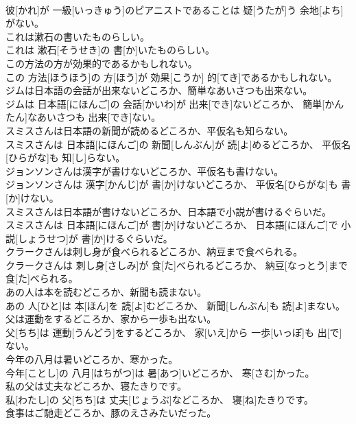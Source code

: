 \documentclass[8pt]{extreport}
\begin{document}
\begin{CJK}{UTF8}{min}
\\	彼[かれ]が 一級[いっきゅう]のピアニストであることは 疑[うたが]う 余地[よち]がない。
\\	これは漱石の書いたものらしい。	
\\	これは 漱石[そうせき]の 書[か]いたものらしい。
\\	この方法の方が効果的であるかもしれない。	
\\	この 方法[ほうほう]の 方[ほう]が 効果[こうか] 的[てき]であるかもしれない。
\\	ジムは日本語の会話が出来ないどころか、簡単なあいさつも出来ない。	
\\	ジムは 日本語[にほんご]の 会話[かいわ]が 出来[でき]ないどころか、 簡単[かんたん]なあいさつも 出来[でき]ない。
\\	スミスさんは日本語の新聞が読めるどころか、平仮名も知らない。	
\\	スミスさんは 日本語[にほんご]の 新聞[しんぶん]が 読[よ]めるどころか、 平仮名[ひらがな]も 知[し]らない。
\\	ジョンソンさんは漢字が書けないどころか、平仮名も書けない。	
\\	ジョンソンさんは 漢字[かんじ]が 書[か]けないどころか、 平仮名[ひらがな]も 書[か]けない。
\\	スミスさんは日本語が書けないどころか、日本語で小説が書けるぐらいだ。	
\\	スミスさんは 日本語[にほんご]が 書[か]けないどころか、 日本語[にほんご]で 小説[しょうせつ]が 書[か]けるぐらいだ。
\\	クラークさんは刺し身が食べられるどころか、納豆まで食べられる。	
\\	クラークさんは 刺し身[さしみ]が 食[た]べられるどころか、 納豆[なっとう]まで 食[た]べられる。
\\	あの人は本を読むどころか、新聞も読まない。	
\\	あの 人[ひと]は 本[ほん]を 読[よ]むどころか、 新聞[しんぶん]も 読[よ]まない。
\\	父は運動をするどころか、家から一歩も出ない。	
\\	父[ちち]は 運動[うんどう]をするどころか、 家[いえ]から 一歩[いっぽ]も 出[で]ない。
\\	今年の八月は暑いどころか、寒かった。	
\\	今年[ことし]の 八月[はちがつ]は 暑[あつ]いどころか、 寒[さむ]かった。
\\	私の父は丈夫などころか、寝たきりです。	
\\	私[わたし]の 父[ちち]は 丈夫[じょうぶ]などころか、 寝[ね]たきりです。
\\	食事はご馳走どころか、豚のえさみたいだった。	

\end{CJK}
\end{document}

